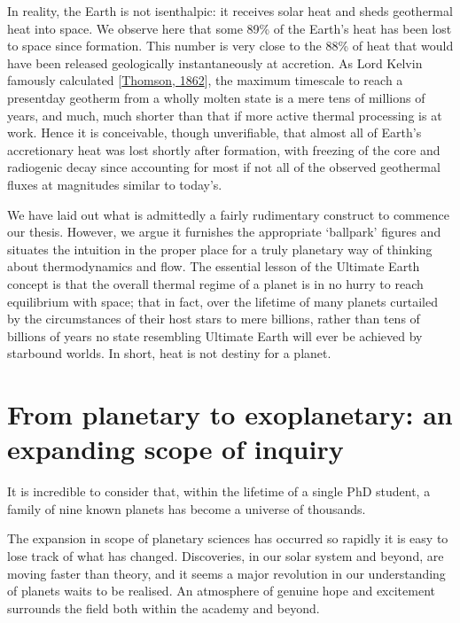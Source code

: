 \documentclass[letterpaper,10pt,english]{jupyterBook}
\begin{document}
\sphinxAtStartPar
In reality, the Earth is not isenthalpic: it receives solar heat and sheds geothermal heat into space. We observe here that some 89\% of the Earth’s heat has been lost to space since formation. This number is very close to the 88\% of heat that would have been released geologically instantaneously at accretion. As Lord Kelvin famously calculated {[}\hyperlink{cite.references:id650}{Thomson, 1862}{]}, the maximum timescale to reach a present\sphinxhyphen{}day geotherm from a wholly molten state is a mere tens of millions of years, and much, much shorter than that if more active thermal processing is at work. Hence it is conceivable, though unverifiable, that almost all of Earth’s accretionary heat was lost shortly after formation, with freezing of the core and radiogenic decay since accounting for most if not all of the observed geothermal fluxes at magnitudes similar to today’s.

\sphinxAtStartPar
We have laid out what is admittedly a fairly rudimentary construct to commence our thesis. However, we argue it furnishes the appropriate ‘ballpark’ figures and situates the intuition in the proper place for a truly planetary way of thinking about thermodynamics and flow. The essential lesson of the Ultimate Earth concept is that the overall thermal regime of a planet is in no hurry to reach equilibrium with space; that in fact, over the lifetime of many planets \sphinxhyphen{} curtailed by the circumstances of their host stars to mere billions, rather than tens of billions of years \sphinxhyphen{} no state resembling Ultimate Earth will ever be achieved by star\sphinxhyphen{}bound worlds. In short, heat is not destiny for a planet.


\section{From planetary to exoplanetary: an expanding scope of inquiry}
\label{\detokenize{content/chapter_01_background/main:from-planetary-to-exoplanetary-an-expanding-scope-of-inquiry}}
\sphinxAtStartPar
It is incredible to consider that, within the lifetime of a single PhD student, a family of nine known planets has become a universe of thousands.

\sphinxAtStartPar
The expansion in scope of planetary sciences has occurred so rapidly it is easy to lose track of what has changed. Discoveries, in our solar system and beyond, are moving faster than theory, and it seems a major revolution in our understanding of planets waits to be realised. An atmosphere of genuine hope and excitement surrounds the field \sphinxhyphen{} both within the academy and beyond.
\end{document}
